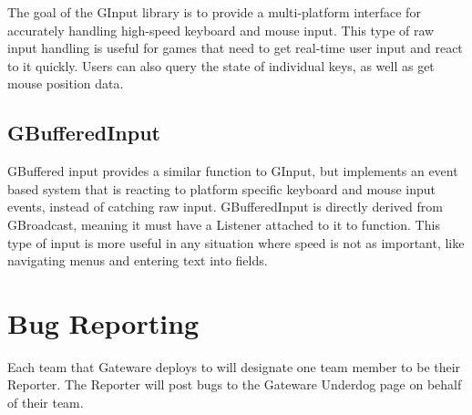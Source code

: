 The goal of the G\+Input library is to provide a multi-\/platform interface for accurately handling high-\/speed keyboard and mouse input. This type of raw input handling is useful for games that need to get real-\/time user input and react to it quickly. Users can also query the state of individual keys, as well as get mouse position data.\hypertarget{index_APIGBufferedInput}{}\subsection{G\+Buffered\+Input}\label{index_APIGBufferedInput}
G\+Buffered input provides a similar function to G\+Input, but implements an event based system that is reacting to platform specific keyboard and mouse input events, instead of catching raw input. G\+Buffered\+Input is directly derived from G\+Broadcast, meaning it must have a Listener attached to it to function. This type of input is more useful in any situation where speed is not as important, like navigating menus and entering text into fields.\hypertarget{index_Reporting}{}\section{Bug Reporting}\label{index_Reporting}
Each team that Gateware deploys to will designate one team member to be their Reporter. The Reporter will post bugs to the Gateware Underdog page on behalf of their team. 